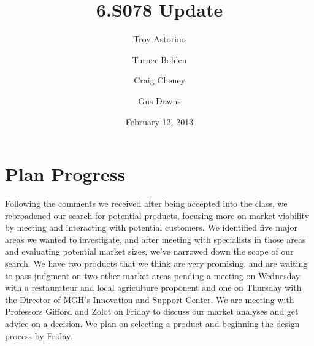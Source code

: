 \documentclass[10pt]{article}
\title{\vspace{-4em}6.S078 Update}
\author{Troy Astorino \and Turner Bohlen \and Craig Cheney \and Gus Downs}
\date{February 12, 2013}
\begin{document}
\maketitle

\section{Plan Progress}
Following the comments we received after being accepted into the class, we
rebroadened our search for potential products, focusing more on market viability
by meeting and interacting with potential customers. We identified five major
areas we wanted to investigate, and after meeting with specialists in those
areas and evaluating potential market sizes, we've narrowed down the scope of
our search. We have two products that we think are very promising, and are
waiting to pass judgment on two other market areas pending a meeting on
Wednesday with a restaurateur and local agriculture proponent and one on
Thursday with the Director of MGH's Innovation and Support Center. We are
meeting with Professors Gifford and Zolot on Friday to discuss our market
analyses and get advice on a decision. We plan on selecting a product and
beginning the design process by Friday.
\end{document}
